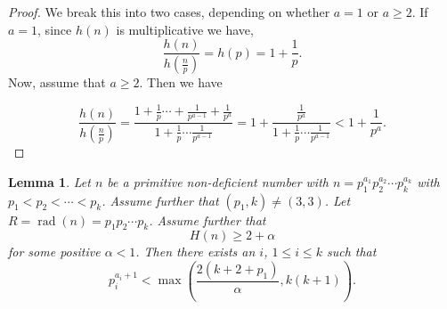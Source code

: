 \documentclass[12pt,reqno]{article}
\theoremstyle{plain}
\newtheorem{lemma}[theorem]{Lemma}
\theoremstyle{definition}
\theoremstyle{remark}
\DeclareMathOperator{\rad}{rad}
\begin{document}
\begin{proof} We break this into two cases, depending on whether $a=1$ or $a \geq 2$. If $a=1$, since $h(n)$ is multiplicative we have, 
$$\frac{h(n)}{h(\frac{n}{p})}  = h(p)=1+ \frac{1}{p}.$$
Now, assume that $a \geq 2$. Then we have

$$\frac{h(n)}{h(\frac{n}{p})} = \frac{1 + \frac{1}{p} \cdots + \frac{1}{p^{a-1}}+\frac{1}{p^a}}{1 + \frac{1}{p} \cdots \frac{1}{p^{a-1}}} = 1 + \frac{\frac{1}{p^a}}{1 + \frac{1}{p} \cdots \frac{1}{p^{a-1}}} < 1 + \frac{1}{p^a}.$$
\end{proof}
    


\begin{lemma}\label{GeneralizedPuchtalemma} Let $n$ be a primitive non-deficient number with $n=p_1^{a_1}p_2^{a_2} \cdots p_k^{a_k}$ with $p_1 < p_2 < \cdots < p_k$. Assume further that $(p_1,k) \neq (3,3)$. Let $R=\rad(n) = p_1p_2\cdots p_k$. Assume further that $$H(n) \geq 2 + \alpha$$ for some positive $\alpha <1$. Then there exists an $i$, $1 \leq i \leq k$ such that 
$$p_i^{a_i+1} < \max\left(\frac{2(k+2+p_1)}{\alpha },k(k+1)\right).$$
\end{lemma}
\end{document}
